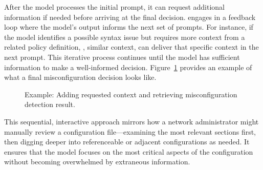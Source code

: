  After the model processes the initial prompt, it can request additional information if needed before arriving at the final decision. \sysname{} engages in a feedback loop where the model’s output informs the next set of prompts. For instance, if the model identifies a possible syntax issue but requires more context from a related policy definition, \ie, similar context, \sysname{} can deliver that specific context in the next prompt. This iterative process continues until the model has sufficient information to make a well-informed decision. Figure~\ref{fig:feedback_and_response} provides an example of what a final misconfiguration decision looks like.
    \begin{figure}[tb]
    \centering
    \caption{Example: Adding requested context and retrieving misconfiguration detection result.}
    \label{fig:feedback_and_response}
\end{figure}


This sequential, interactive approach mirrors how a network administrator might manually review a configuration file—examining the most relevant sections first, then digging deeper into referenceable or adjacent configurations as needed. It ensures that the model focuses on the most critical aspects of the configuration without becoming overwhelmed by extraneous information.

